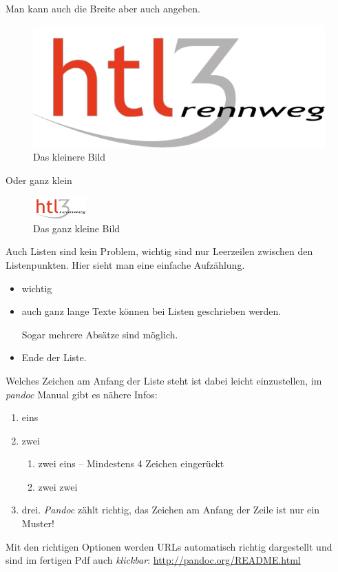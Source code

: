 Man kann auch die Breite aber auch angeben.

\begin{figure}
\centering
\includegraphics[width=12cm]{HTL3RLogo.png}
\caption{Das kleinere Bild}
\end{figure}

Oder ganz klein

\begin{figure}
\centering
\includegraphics[width=2cm]{HTL3RLogo.png}
\caption{Das ganz kleine Bild}
\end{figure}

Auch Listen sind kein Problem, wichtig sind nur Leerzeilen zwischen den
Listenpunkten. Hier sieht man eine einfache Aufzählung.

\begin{itemize}
\item
  wichtig
\item
  auch ganz lange Texte können bei Listen geschrieben werden.

  Sogar mehrere Absätze sind möglich.
\item
  Ende der Liste.
\end{itemize}

Welches Zeichen am Anfang der Liste steht ist dabei leicht einzustellen,
im \emph{pandoc} Manual gibt es nähere Infos:

\begin{enumerate}
\def\labelenumi{\arabic{enumi}.}
\item
  eins
\item
  zwei

  \begin{enumerate}
  \def\labelenumii{\roman{enumii}.}
  \tightlist
  \item
    zwei eins -- Mindestens 4 Zeichen eingerückt
  \item
    zwei zwei
  \end{enumerate}
\item
  drei. \emph{Pandoc} zählt richtig, das Zeichen am Anfang der Zeile ist
  nur ein Muster!
\end{enumerate}

Mit den richtigen Optionen werden URLs automatisch richtig dargestellt
und sind im fertigen Pdf auch \emph{klickbar}:
\url{http://pandoc.org/README.html}
